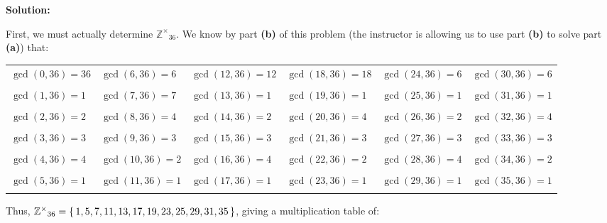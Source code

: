 \documentclass{article}
\newenvironment{solution}{
	\vspace{.5em}
	\par
	\begin{adjustwidth}{1.5em}{}
	\textbf{{Solution:}}
	\par
	\vspace{.5em}
}{
	\vspace{1em}
	\end{adjustwidth}
	\setcounter{step}{0}
}
\newcounter{step}
\newcounter{problem}
\begin{document}
\begin{solution}
	First, we must actually determine $\mathbb{Z^{\times}}_{36}$. We know by part \textbf{(b)} of this problem (the instructor is allowing us to use part \textbf{(b)} to solve part \textbf{(a)}) that: \\

	{
		\small
		\setlength{\tabcolsep}{3pt}
		\begin{tabularx}{\linewidth}{Y  Y  Y  Y  Y  Y}
			$\gcd(0, 36) = 36$ & $\gcd(6, 36) = 6$ & $\gcd(12, 36) = 12$ & $\gcd(18, 36) = 18$ & $\gcd(24, 36) = 6$ & $\gcd(30, 36) = 6$ \\\\
			$\boxed{\gcd(1, 36) = 1}$ & $\boxed{\gcd(7, 36) = 7}$ & $\boxed{\gcd(13, 36) = 1}$ & $\boxed{\gcd(19, 36) = 1}$ & $\boxed{\gcd(25, 36) = 1}$ & $\boxed{\gcd(31, 36) = 1}$ \\\\
			$\gcd(2, 36) = 2$ & $\gcd(8, 36) = 4$ & $\gcd(14, 36) = 2$ & $\gcd(20, 36) = 4$ & $\gcd(26, 36) = 2$ & $\gcd(32, 36) = 4$ \\\\
			$\gcd(3, 36) = 3$ & $\gcd(9, 36) = 3$ & $\gcd(15, 36) = 3$ & $\gcd(21, 36) = 3$ & $\gcd(27, 36) = 3$ & $\gcd(33, 36) = 3$ \\\\
			$\gcd(4, 36) = 4$ & $\gcd(10, 36) = 2$ & $\gcd(16, 36) = 4$ & $\gcd(22, 36) = 2$ & $\gcd(28, 36) = 4$ & $\gcd(34, 36) = 2$ \\\\
			$\boxed{\gcd(5, 36) = 1}$ & $\boxed{\gcd(11, 36) = 1}$ & $\boxed{\gcd(17, 36) = 1}$ & $\boxed{\gcd(23, 36) = 1}$ & $\boxed{\gcd(29, 36) = 1}$ & $\boxed{\gcd(35, 36) = 1}$ \\\\
		\end{tabularx}
	}

	\vspace{1em}

	Thus, $\mathbb{Z^{\times}}_{36} = \set{1, 5, 7, 11, 13, 17, 19, 23, 25, 29, 31, 35}$, giving a multiplication table of:

	\vspace{1em}


\end{solution}
\end{document}
